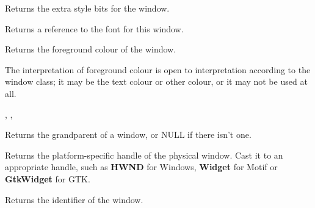 \label{wxwindowgetextrastyle}


Returns the extra style bits for the window.

\label{wxwindowgetfont}


Returns a reference to the font for this window.



\label{wxwindowgetforegroundcolour}


Returns the foreground colour of the window.


The interpretation of foreground colour is open to interpretation according
to the window class; it may be the text colour or other colour, or it may not
be used at all.


,\rtfsp
{},\rtfsp
{}



Returns the grandparent of a window, or NULL if there isn't one.



Returns the platform-specific handle of the physical window. Cast it to an appropriate
handle, such as {\bf HWND} for Windows, {\bf Widget} for Motif or {\bf GtkWidget} for GTK.


\label{wxwindowgetid}


Returns the identifier of the window.


